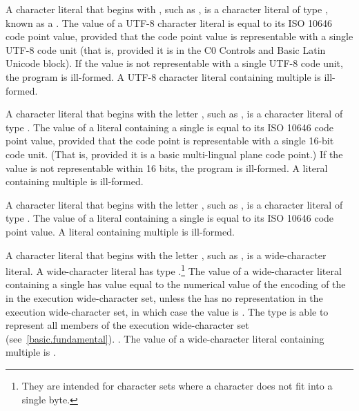 \pnum
A character literal that begins with ,
such as ,
is a character literal of type ,
known as a .
The value of a UTF-8 character literal
is equal to its ISO 10646 code point value,
provided that the code point value
is representable with a single UTF-8 code unit
(that is, provided it is in the C0 Controls and Basic Latin Unicode block).
If the value is not representable with a single UTF-8 code unit,
the program is ill-formed.
A UTF-8 character literal containing multiple  is ill-formed.

\pnum
{}%
%
A character literal that begins with the letter , such as
, is a character literal of type . The value
of a  literal containing a single  is
equal to its ISO 10646 code point value, provided that the code point is
representable with a single 16-bit code unit. (That is, provided it is a
basic multi-lingual plane code point.) If the value is not representable
within 16 bits, the program is ill-formed. A  literal
containing multiple  is ill-formed.

\pnum
{}%
%
A character
literal that begins with the letter , such as , is
a character literal of type . The value of a
 literal containing a single  is equal
to its ISO 10646 code point value. A  literal containing
multiple  is ill-formed.

\pnum
{}%
%
%
A character literal that
begins with the letter , such as ,
%
is a wide-character literal. A wide-character literal has type
.\footnote{They are intended for character sets where a character does
not fit into a single byte. }
The value of a wide-character literal containing a single
 has value equal to the numerical value of the encoding
of the  in the execution wide-character set, unless the
 has no representation in the execution wide-character set, in which
case the value is . \enternote The type  is able to
represent all members of the execution wide-character set (see~\ref{basic.fundamental}).
\exitnote. The value
of a wide-character literal containing multiple  is
.

